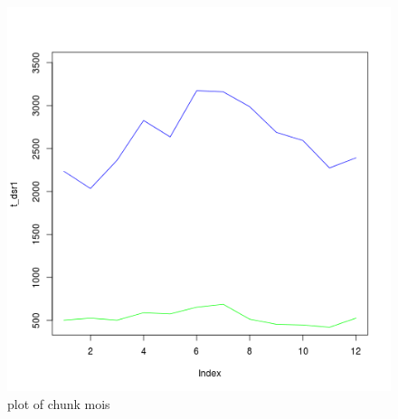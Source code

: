 \begin{figure}[htbp]
\centering
\includegraphics{figure/mois2.png}
\caption{plot of chunk mois}
\end{figure}

